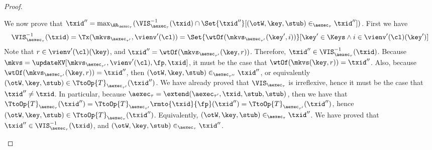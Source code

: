 \begin{proof}
\begin{itemize}
\begin{itemize}
We now prove that 
$\txid'' = \max_{\AR_{\aexec_{\tau}}}(\VIS^{-1}_{\aexec_{\tau}}(\txid) \cap \Set{ \txid'' }[ (\otW, \key, \stub) \in_{\aexec_{\tau}} \txid''])$. 
First we have
\[ 
\begin{array}{l}
\VIS^{-1}_{\aexec_{\tau}}(\txid) = 
\Tx(\mkvs_{\aexec_{\tau'}}, \vienv'(\cl)) = 
\Set{\wtOf(\mkvs_{\aexec_{\tau'}}(\key',  i)) }[ \key' \in \Keys \land  i \in \vienv'(\cl)(\key')]
\end{array}
\]
Note that $r \in \vienv'(\cl)(\key)$, and $\txid'' = \wtOf(\mkvs_{\aexec_{\tau'}}(\key, r))$. 
Therefore, $\txid'' \in \VIS^{-1}_{\aexec_{\tau}}(\txid)$. 
Because $\mkvs = \updateKV[\mkvs_{\aexec_{\tau'}}, \vienv'(\cl), \fp, \txid]$, it 
must be the case that $\wtOf(\mkvs(\key, r)) = \txid''$. Also, because $\wtOf(\mkvs_{\aexec_{\tau'}}(\key, r)) = \txid''$, 
then $(\otW, \key, \stub) \in_{\aexec_{\tau''}} \txid''$, or equivalently $(\otW, \key, \stub) \in \TtoOp{T}_{\aexec_{\tau'}}(\txid'')$. 
We have already proved that $\VIS_{\aexec_{\tau}}$ is irreflexive, hence it must be the case that $\txid'' \neq \txid$. 
In particular, because $\aexec_{\tau} = \extend(\aexec_{\tau'}, \txid, \stub, \stub)$, then we have that 
$\TtoOp{T}_{\aexec_{\tau}}(\txid'') = \TtoOp{T}_{\aexec_{\tau'}}\rmto{\txid}{\fp}(\txid'') = 
\TtoOp{T}_{\aexec_{\tau'}}(\txid'')$, hence $(\otW, \key, \stub) \in \TtoOp{T}_{\aexec_{\tau}}(\txid'')$. Equivalently, 
$(\otW, \key, \stub) \in_{\aexec_{\tau}} \txid''$. We have proved that $\txid'' \in \VIS^{-1}_{\aexec_{\tau}}(\txid)$, 
and $(\otW, \key, \stub) \in_{\aexec_{\tau}} \txid''$. 


\end{itemize}
\end{itemize}
\end{proof}
